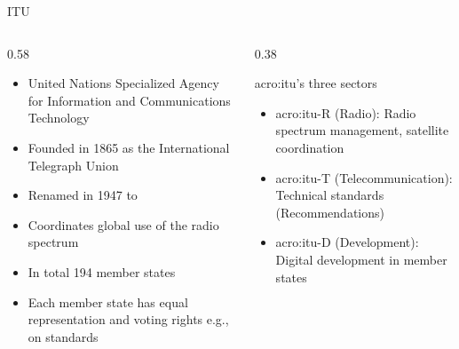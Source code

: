 \begin{frame}{ITU}
  \begin{columns}[T,onlytextwidth]
    \begin{column}{0.58\textwidth}
      \begin{itemize}
        \item United Nations Specialized Agency for Information and Communications Technology
        \item Founded in 1865 as the International Telegraph Union
        \item Renamed in 1947 to 
        \item Coordinates global use of the radio spectrum
        \item In total 194 member states
        \item Each member state has equal representation and voting rights e.g., on standards
      \end{itemize}
    \end{column}
    \begin{column}{0.38\textwidth}
      \begin{block}{\gls{acro:itu}'s three sectors}
        \begin{itemize}
          \item \Gls{acro:itu}-R (Radio): Radio spectrum management, satellite coordination
          \item \Gls{acro:itu}-T (Telecommunication): Technical standards (Recommendations)
          \item \Gls{acro:itu}-D (Development): Digital development in member states
        \end{itemize}
      \end{block}
    \end{column}
  \end{columns}
\end{frame}

